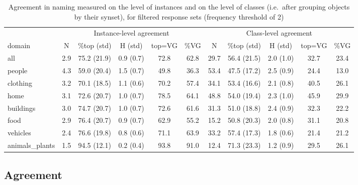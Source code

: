 \begin{table}
\begin{tabular}{lccccc|ccccc}
\toprule
 & \multicolumn{5}{c|}{Instance-level agreement} & \multicolumn{5}{c}{Class-level agreement}\\ 
          domain &    N &         \%top (std) &          H (std) & top=VG &   \%VG &     N &         \%top (std) &          H (std) & top=VG &   \%VG \\
\midrule
            all &  2.9 &  75.2 (21.9) &  0.9 (0.7) &   72.8 &  62.8 &  29.7 &  56.4 (21.5) &  2.0 (1.0) &   32.7 &  23.4 \\
            \midrule
                     people &  4.3 &  59.0 (20.4) &  1.5 (0.7) &   49.8 &  36.3 &  53.4 &  47.5 (17.2) &  2.5 (0.9) &   24.4 &  13.0 \\
       clothing &  3.2 &  70.1 (18.5) &  1.1 (0.6) &   70.2 &  57.4 &  34.1 &  53.4 (16.6) &  2.1 (0.8) &   40.5 &  26.1 \\
           home &  3.1 &  72.6 (20.7) &  1.0 (0.7) &   78.5 &  64.1 &  48.8 &  54.0 (19.4) &  2.3 (1.0) &   45.9 &  29.9 \\
                 buildings &  3.0 &  74.7 (20.7) &  1.0 (0.7) &   72.6 &  61.6 &  31.3 &  51.0 (18.8) &  2.4 (0.9) &   32.3 &  22.2 \\
           food &  2.9 &  76.4 (20.7) &  0.9 (0.7) &   62.9 &  55.2 &  15.2 &  50.8 (20.3) &  2.0 (0.8) &   31.1 &  20.8 \\
                  vehicles &  2.4 &  76.6 (19.8) &  0.8 (0.6) &   71.1 &  63.9 &  33.2 &  57.4 (17.3) &  1.8 (0.6) &   21.4 &  21.2 \\
 animals\_plants &  1.5 &  94.5 (12.1) &  0.2 (0.4) &   93.8 &  91.0 &  12.4 &  71.3 (23.3) &  1.2 (0.9) &   29.5 &  26.1 \\
\bottomrule
\end{tabular}
\vspace{-0.3cm}
\caption{Agreement in naming measured on the level of instances and on the level of \vgenome classes (i.e.\ after grouping objects by their \vg synset), for filtered response sets (frequency threshold of 2)}
\label{tab:agree}
\end{table}

\subsection{Agreement}

